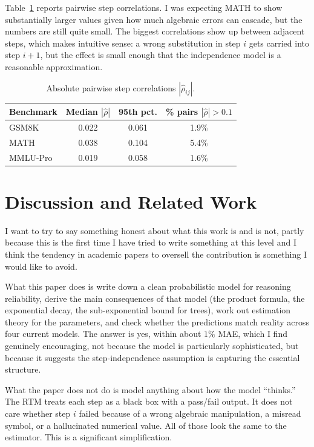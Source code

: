 \documentclass[11pt]{article}
\theoremstyle{plain}
\theoremstyle{definition}
\begin{document}
Table~\ref{tab:correlation} reports pairwise step correlations. I was
expecting MATH to show substantially larger values given how much algebraic
errors can cascade, but the numbers are still quite small. The biggest
correlations show up between adjacent steps, which makes intuitive sense: a
wrong substitution in step $i$ gets carried into step $i+1$, but the effect
is small enough that the independence model is a reasonable approximation.

\begin{table}[ht]
\centering
\caption{Absolute pairwise step correlations $|\hat\rho_{ij}|$.}
\label{tab:correlation}
\begin{tabular}{lccc}
\toprule
\textbf{Benchmark} & \textbf{Median $|\hat\rho|$} & \textbf{95th pct.}
  & \textbf{\% pairs $|\hat\rho| > 0.1$} \\
\midrule
GSM8K    & 0.022 & 0.061 & 1.9\% \\
MATH     & 0.038 & 0.104 & 5.4\% \\
MMLU-Pro & 0.019 & 0.058 & 1.6\% \\
\bottomrule
\end{tabular}
\end{table}

\section{Discussion and Related Work}
\label{sec:related}

I want to try to say something honest about what this work is and is not, partly
because this is the first time I have tried to write something at this level
and I think the tendency in academic papers to oversell the contribution is
something I would like to avoid.

What this paper does is write down a clean probabilistic model for reasoning
reliability, derive the main consequences of that model (the product formula,
the exponential decay, the sub-exponential bound for trees), work out
estimation theory for the parameters, and check whether the predictions match
reality across four current models. The answer is yes, within about $1\%$ MAE,
which I find genuinely encouraging, not because the model is particularly
sophisticated, but because it suggests the step-independence assumption is
capturing the essential structure.

What the paper does not do is model anything about how the model ``thinks.''
The RTM treats each step as a black box with a pass/fail output. It does not
care whether step $i$ failed because of a wrong algebraic manipulation, a
misread symbol, or a hallucinated numerical value. All of those look the same
to the estimator. This is a significant simplification.
\end{document}

